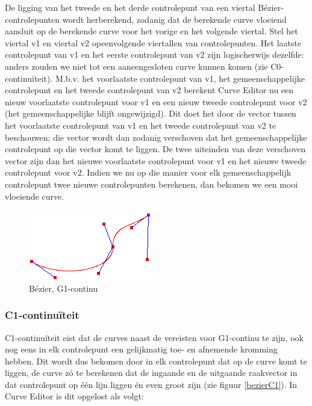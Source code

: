 \documentclass[a4paper,11pt,oneside, titlepage]{article}
\begin{document}
De ligging van het tweede en het derde controlepunt van een viertal B\'ezier-controlepunten wordt herberekend, zodanig dat de berekende curve vloeiend aansluit op de berekende curve voor het vorige en het volgende viertal. Stel het viertal v1 en viertal v2 opeenvolgende viertallen van controlepunten. Het laatste controlepunt van v1 en het eerste controlepunt van v2 zijn logischerwijs dezelfde: anders zouden we niet tot een aaneengesloten curve kunnen komen (zie C0-continu\"iteit). M.b.v. het voorlaatste controlepunt van v1, het gemeenschappelijke controlepunt en het tweede controlepunt van v2 berekent Curve Editor nu een nieuw voorlaatste controlepunt voor v1 en een nieuw tweede controlepunt voor v2 (het gemeenschappelijke blijft ongewijzigd). Dit doet het door de vector tussen het voorlaatste controlepunt van v1 en het tweede controlepunt van v2 te beschouwen; die vector wordt dan zodanig verschoven dat het gemeenschappelijke controlepunt op die vector komt te liggen. De twee uiteinden van deze verschoven vector zijn dan het nieuwe voorlaatste controlepunt voor v1 en het nieuwe tweede controlepunt voor v2. Indien we nu op die manier voor elk gemeenschappelijk controlepunt twee nieuwe controlepunten berekenen, dan bekomen we een mooi vloeiende curve.
\begin{figure}
\begin{center}
\includegraphics[scale=0.4]{./screenies2/bezierG1.png}
\caption{B\'ezier, G1-continu}\label{bezierG1}
\end{center}
\end{figure}
\subsubsection{C1-continu\"iteit \label{sC1}}
C1-continu\"iteit eist dat de curves naast de vereisten voor G1-continu te zijn, ook nog eens in elk controlepunt een gelijkmatig toe- en afnemende kromming hebben. Dit wordt dus bekomen door in elk controlepunt dat op de curve komt te liggen, de curve z\'o te berekenen dat de ingaande en de uitgaande raakvector
in dat controlepunt op \'e\'en lijn liggen \'en even groot zijn (zie figuur \ref{bezierC1}). In Curve Editor is dit opgelost als volgt:
\end{document}
